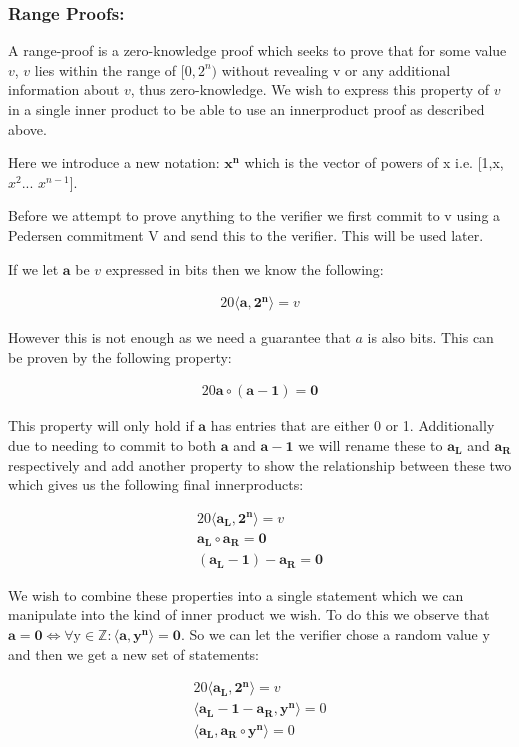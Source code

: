 \documentclass{article}
\newcommand{\eq}[1]{\begin{alignat*}{20}#1\end{alignat*}}
\renewcommand{\vec}[1]{\boldsymbol{#1}}
\newcommand{\ran}[1]{\mathrm{#1}}
\newcommand{\vecran}[1]{\mathbf{#1}}
\newcommand{\dotp}[2]{\langle #1, #2 \rangle}
\begin{document}
\subsubsection{Range Proofs:}\label{range-proofs}

A range-proof is a zero-knowledge proof which seeks to prove that for some value $v$, $v$ lies within the range of $[0,2^n)$ without revealing v or any additional information about $v$, thus zero-knowledge. We wish to express this property of $v$ in a single inner product to be able to use an innerproduct proof as described above. 

Here we introduce a new notation: $\vec{x^n}$ which is the vector of powers of x i.e. [1,x,$x^2$... $x^{n-1}$].

Before we attempt to prove anything to the verifier we first commit to v using a Pedersen commitment V and send this to the verifier. This will be used later.

If we let $\vec{a}$ be $v$ expressed in bits then we know the following:

\eq{\dotp{\vec{a}}{\vec{2^n}} = v}

However this is not enough as we need a guarantee that $a$ is also bits. This can be proven by the following property: 

\eq{\vec{a}\circ (\vec{a} - \vec{1}) = \vec{0}}

This property will only hold if $\vec{a}$ has entries that are either 0 or 1. Additionally due to needing to commit to both $\vec{a}$ and $\vec{a} - \vec{1}$ we will rename these to $\vec{a_L}$ and $\vec{a_R}$ respectively and add another property to show the relationship between these two which gives us the following final innerproducts:

\eq{
	\dotp{\vec{a_L}}{\vec{2^n}} = v \\
	\vec{a_L}\circ \vec{a_R} = \vec{0} \\
	(\vec{a_L} - \vec{1}) - \vec{a_R} = \vec{0}
}

We wish to combine these properties into a single statement which we can manipulate into the kind of inner product we wish. To do this we observe that $\vec{a} = \vec{0} \iff \forall \ran{y}\in\mathbb{Z}: \dotp{\vec{a}}{\vec{y^n}} = \vec{0}$. So we can let the verifier chose a random value $\ran{y}$ and then we get a new set of statements:

\eq{
	\dotp{\vec{a_L}}{\vec{2^n}} = v \\
	\dotp{\vec{a_L} - \vec{1} - \vec{a_R}}{\vecran{y^n}} = 0 \\
	\dotp{\vec{a_L}}{\vec{a_R}\circ \vecran{y^n}} = 0
}
\end{document}
